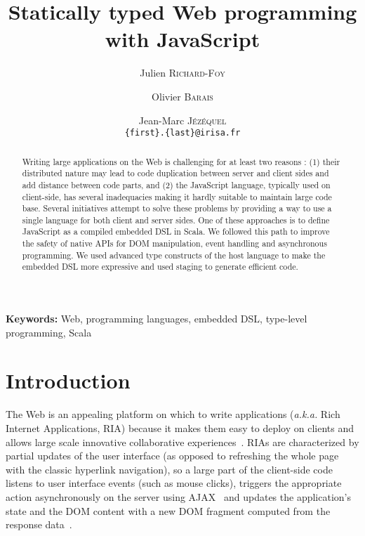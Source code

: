 \documentclass[american,english,runningheads]{llncs}
\newcommand{\aka}{\emph{a.k.a.}}
\newcommand{\noun}[1]{\textsc{#1}}
\begin{document}
\title{Statically typed Web programming with JavaScript}

\author{Julien \noun{Richard-Foy} \and Olivier \noun{Barais} \and Jean-Marc \noun{Jézéquel}\\
\texttt{\{first\}.\{last\}@irisa.fr}}


\maketitle


\begin{abstract}
Writing large applications on the Web is challenging for at least two reasons : (1) their distributed nature may lead to code duplication between server and client sides and add distance between code parts, and (2) the JavaScript language, typically used on client-side, has several inadequacies making it hardly suitable to maintain large code base. Several initiatives attempt to solve these problems by providing a way to use a single language for both client and server sides. One of these approaches is to define JavaScript as a compiled embedded DSL in Scala. We followed this path to improve the safety of native APIs for DOM manipulation, event handling and asynchronous programming. We used advanced type constructs of the host language to make the embedded DSL more expressive and used staging to generate efficient code.
\end{abstract}

{\bf Keywords:} Web, programming languages, embedded DSL, type-level programming, Scala

\section{Introduction}

The Web is an appealing platform on which to write applications (\aka{} Rich Internet Applications, RIA) because it makes them easy to deploy on clients and allows large scale innovative collaborative experiences~\cite{Farrell07_RIA,Mikkonen08_SpaghettiJs}. RIAs are characterized by partial updates of the user interface (as opposed to refreshing the whole page with the classic hyperlink navigation), so a large part of the client-side code listens to user interface events (such as mouse clicks), triggers the appropriate action asynchronously on the server using AJAX~\cite{Garrett05_Ajax} and updates the application’s state and the DOM content with a new DOM fragment computed from the response data~\cite{Farrell07_RIA,Busch09_StateOfArtRIA}.
\end{document}
